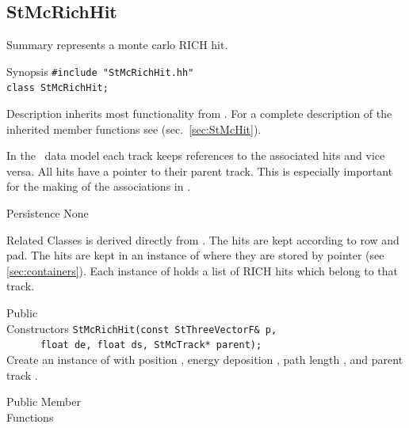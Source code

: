 \subsection{StMcRichHit}
 
\label{sec:StMcRichHit}
\begin{Entry}
\item[Summary]
     represents a monte carlo RICH hit.

\item[Synopsis]
    \verb+#include "StMcRichHit.hh"+\\
    \verb+class StMcRichHit;+\\

\item[Description]    
     inherits most functionality from .
    For a complete description of the inherited member functions see
     (sec.~\ref{sec:StMcHit}).

    In the \StMcEvent\ data model each track keeps references to the
    associated hits and vice versa. All hits have a pointer to their
    parent track.  This is especially important for the making of the
    associations in \StAssociationMaker. 
    
    
    
\item[Persistence]
    None

\item[Related Classes]
     is derived directly from .
    The hits are kept according to row and pad.
    The hits are kept in an instance of 
    where they are stored by pointer (see \ref{sec:containers}).
    Each instance of  holds a list of RICH hits
    which belong to that track.

\item[Public\\ Constructors]
    \verb+StMcRichHit(const StThreeVectorF& p,+\\
    \verb+      float de, float ds, StMcTrack* parent);+\\
    
    Create an instance of  with position ,
    energy deposition , path length , and parent track .

\item[Public Member\\ Functions]


\end{Entry}
